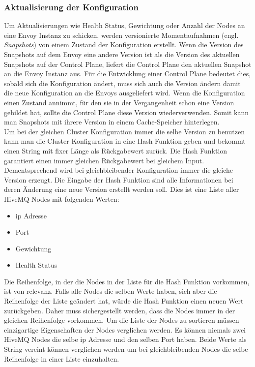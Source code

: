 \subsubsection{Aktualisierung der Konfiguration}
Um Aktualisierungen wie Health Status, Gewichtung oder Anzahl der Nodes an eine Envoy Instanz zu schicken, werden versionierte Momentaufnahmen (engl. \textit{Snapshots}) von einem Zustand der Konfiguration erstellt. Wenn die Version des Snapshots auf dem Envoy eine andere Version ist als die Version des aktuellen Snapshots auf der Control Plane, liefert die Control Plane den aktuellen Snapshot an die Envoy Instanz aus.
Für die Entwicklung einer Control Plane bedeutet dies, sobald sich die Konfiguration ändert, muss sich auch die Version ändern damit die neue Konfiguration an die Envoys ausgeliefert wird. Wenn die Konfiguration einen Zustand annimmt, für den sie in der Vergangenheit schon eine Version gebildet hat, sollte die Control Plane diese Version wiederverwenden. Somit kann man Snapshots mit ihrere Version in einem Cache-Speicher hinterlegen.
\\
Um bei der gleichen Cluster Konfiguration immer die selbe Version zu benutzen kann man die Cluster Konfiguration in eine Hash Funktion geben und bekommt einen String mit fixer Länge als Rückgabewert zurück. Die Hash Funktion garantiert einen immer gleichen Rückgabewert bei gleichem Input. Dementsprechend wird bei gleichbleibender Konfiguration immer die gleiche Version erzeugt.
Die Eingabe der Hash Funktion sind alle Informationen bei deren Änderung eine neue Version erstellt werden soll. Dies ist eine Liste aller HiveMQ Nodes mit folgenden Werten:
\begin{itemize}
  \item \ac{ip} Adresse
  \item Port
  \item Gewichtung
  \item Health Status
\end{itemize}
Die Reihenfolge, in der die Nodes in der Liste für die Hash Funktion vorkommen, ist von relevanz. Falls alle Nodes die selben Werte haben, sich aber die Reihenfolge der Liste geändert hat, würde die Hash Funktion einen neuen Wert zurückgeben. Daher muss sichergestellt werden, dass die Nodes immer in der gleichen Reihenfolge vorkommen. Um die Liste der Nodes zu sortieren müssen einzigartige Eigenschaften der Nodes verglichen werden.
Es können niemals zwei HiveMQ Nodes die selbe \ac{ip} Adresse und den selben Port haben. Beide Werte als String vereint können verglichen werden um bei gleichbleibenden Nodes die selbe Reihenfolge in einer Liste einzuhalten.

